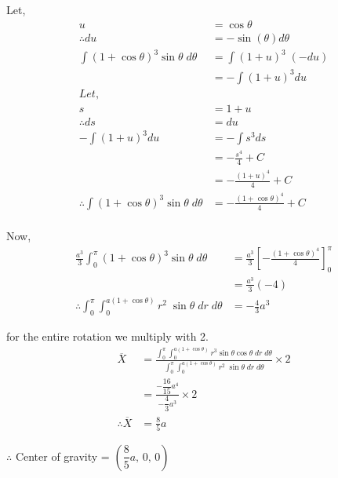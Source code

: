 \documentclass{article}
\begin{document}
{Let,
\begin{align*}
    u															& = \cos \theta \\
    \therefore du												& = -\sin (\theta) d\theta \\
    \int (1+\cos \theta)^3 \sin \theta \; d\theta
    & = \int (1+u)^3 \; (-du) \\
    & = -\int (1+u)^3 du \\
    Let, \quad\quad												& \\
    s															& = 1+u \\
    \therefore ds												& = du \\
    -\int (1+u)^3 du											& = -\int s^3 ds \\
                                                                & = -\frac{s^4}{4} + C \\
                                                                & = -\frac{(1+u)^4}{4} + C \\
    \therefore \int (1+\cos \theta)^3 \sin \theta \; d\theta	& = -\frac{(1+ \cos \theta)^4}{4} + C \\
\end{align*}

Now,
\begin{align*}
    \frac{a^3}{3} \int^\pi_0 (1+\cos \theta)^3 \sin \theta \; d\theta
    & = \frac{a^3}{3} \left[ -\frac{(1+ \cos \theta)^4}{4} \right]^\pi_0 \\
    & = \frac{a^3}{3} (-4) \\
    \therefore \int^\pi_0 \int^{a(1+\cos \theta)}_0 r^2 \; \sin \theta \; dr \; d\theta
    & = -\frac{4}{3} a^3
\end{align*}

for the entire rotation we multiply with 2.
\begin{align*}
    \overline{X}			& = \frac{\int^\pi_0 \int^{a(1+\cos \theta)}_0 r^3 \sin \theta \cos \theta \; dr \; d\theta}{\int^\pi_0 \int^{a(1+\cos \theta)}_0 r^2 \; \sin \theta \; dr \; d\theta} \times 2\\
                            & = \frac{-\dfrac{16}{15} a^4}{-\dfrac{4}{3} a^3} \times 2\\
    \therefore \overline{X}	& = \frac{8}{5} a
\end{align*}

$\therefore$ Center of gravity = $\left( \dfrac{8}{5}a,\, 0,\, 0 \right)$
}

\newpage
\end{document}
